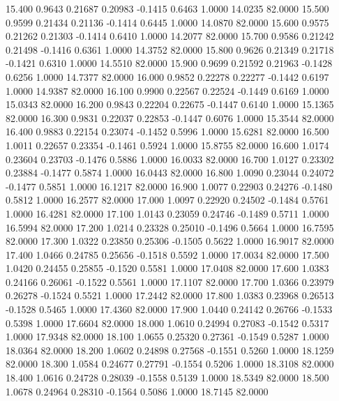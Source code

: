   15.400   0.9643   0.21687   0.20983  -0.1415   0.6463   1.0000  14.0235  82.0000
  15.500   0.9599   0.21434   0.21136  -0.1414   0.6445   1.0000  14.0870  82.0000
  15.600   0.9575   0.21262   0.21303  -0.1414   0.6410   1.0000  14.2077  82.0000
  15.700   0.9586   0.21242   0.21498  -0.1416   0.6361   1.0000  14.3752  82.0000
  15.800   0.9626   0.21349   0.21718  -0.1421   0.6310   1.0000  14.5510  82.0000
  15.900   0.9699   0.21592   0.21963  -0.1428   0.6256   1.0000  14.7377  82.0000
  16.000   0.9852   0.22278   0.22277  -0.1442   0.6197   1.0000  14.9387  82.0000
  16.100   0.9900   0.22567   0.22524  -0.1449   0.6169   1.0000  15.0343  82.0000
  16.200   0.9843   0.22204   0.22675  -0.1447   0.6140   1.0000  15.1365  82.0000
  16.300   0.9831   0.22037   0.22853  -0.1447   0.6076   1.0000  15.3544  82.0000
  16.400   0.9883   0.22154   0.23074  -0.1452   0.5996   1.0000  15.6281  82.0000
  16.500   1.0011   0.22657   0.23354  -0.1461   0.5924   1.0000  15.8755  82.0000
  16.600   1.0174   0.23604   0.23703  -0.1476   0.5886   1.0000  16.0033  82.0000
  16.700   1.0127   0.23302   0.23884  -0.1477   0.5874   1.0000  16.0443  82.0000
  16.800   1.0090   0.23044   0.24072  -0.1477   0.5851   1.0000  16.1217  82.0000
  16.900   1.0077   0.22903   0.24276  -0.1480   0.5812   1.0000  16.2577  82.0000
  17.000   1.0097   0.22920   0.24502  -0.1484   0.5761   1.0000  16.4281  82.0000
  17.100   1.0143   0.23059   0.24746  -0.1489   0.5711   1.0000  16.5994  82.0000
  17.200   1.0214   0.23328   0.25010  -0.1496   0.5664   1.0000  16.7595  82.0000
  17.300   1.0322   0.23850   0.25306  -0.1505   0.5622   1.0000  16.9017  82.0000
  17.400   1.0466   0.24785   0.25656  -0.1518   0.5592   1.0000  17.0034  82.0000
  17.500   1.0420   0.24455   0.25855  -0.1520   0.5581   1.0000  17.0408  82.0000
  17.600   1.0383   0.24166   0.26061  -0.1522   0.5561   1.0000  17.1107  82.0000
  17.700   1.0366   0.23979   0.26278  -0.1524   0.5521   1.0000  17.2442  82.0000
  17.800   1.0383   0.23968   0.26513  -0.1528   0.5465   1.0000  17.4360  82.0000
  17.900   1.0440   0.24142   0.26766  -0.1533   0.5398   1.0000  17.6604  82.0000
  18.000   1.0610   0.24994   0.27083  -0.1542   0.5317   1.0000  17.9348  82.0000
  18.100   1.0655   0.25320   0.27361  -0.1549   0.5287   1.0000  18.0364  82.0000
  18.200   1.0602   0.24898   0.27568  -0.1551   0.5260   1.0000  18.1259  82.0000
  18.300   1.0584   0.24677   0.27791  -0.1554   0.5206   1.0000  18.3108  82.0000
  18.400   1.0616   0.24728   0.28039  -0.1558   0.5139   1.0000  18.5349  82.0000
  18.500   1.0678   0.24964   0.28310  -0.1564   0.5086   1.0000  18.7145  82.0000
